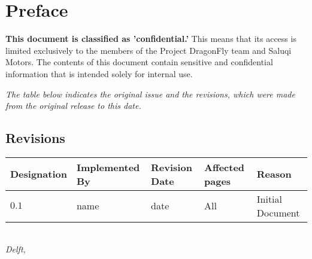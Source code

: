 \chapter*{Preface}

\textbf{This document is classified as 'confidential.'} This means that its access is limited exclusively to the members of the Project DragonFly team and Saluqi Motors. The contents of this document contain sensitive and confidential information that is intended solely for internal use.

\vspace*{\fill}

\emph{The table below indicates the original issue and the revisions, which were made from the original release to this date.}

\section*{Revisions}
\begin{center}
\begin{longtable}{p{2cm}p{2.5cm}p{2.5cm}p{2.5cm}p{4cm}}
	\toprule
	Designation & Implemented By & Revision Date & Affected pages &  Reason \\
	\midrule\endhead %
	$0.1$ & name & date & All & Initial Document\\
	\bottomrule
	\bottomrule
\end{longtable}
\end{center}

\vspace*{\fill}
\begin{flushright}
{\makeatletter\itshape
    \@author \\
    Delft, \monthname{} \the\year{}
\makeatother}
\end{flushright}
 